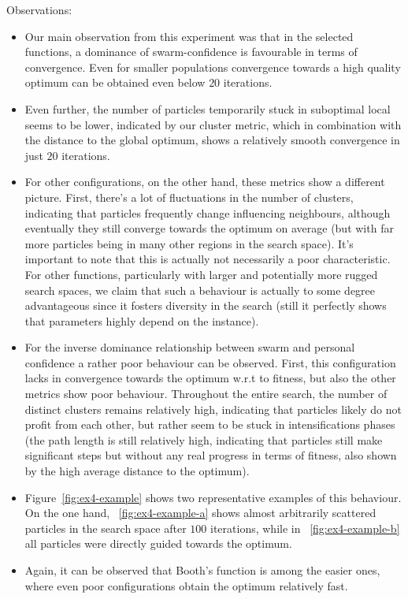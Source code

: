 \documentclass[12pt]{article}
\begin{document}
Observations:
\begin{itemize}
	\item Our main observation from this experiment was that in the selected functions, a dominance of swarm-confidence is favourable in terms of convergence. Even for smaller populations convergence towards a high quality optimum can be obtained even below $20$ iterations.
	\item Even further, the number of particles temporarily stuck in suboptimal local seems to be lower, indicated by our cluster metric, which in combination with the distance to the global optimum, shows a relatively smooth convergence in just $20$ iterations. 
	\item For other configurations, on the other hand, these metrics show a different picture. First, there's a lot of fluctuations in the number of clusters, indicating that particles frequently change influencing neighbours, although eventually they still converge towards the optimum on average (but with far more particles being in many other regions in the search space). It's important to note that this is actually not necessarily a poor characteristic. For other functions, particularly with larger and potentially more rugged search spaces, we claim that such a behaviour is actually to some degree advantageous since it fosters diversity in the search (still it perfectly shows that parameters highly depend on the instance).
	\item For the inverse dominance relationship between swarm and personal confidence a rather poor behaviour can be observed. First, this configuration lacks in convergence towards the optimum w.r.t to fitness, but also the other metrics show poor behaviour. Throughout the entire search, the number of distinct clusters remains relatively high, indicating that particles likely do not profit from each other, but rather seem to be stuck in intensifications phases (the path length is still relatively high, indicating that particles still make significant steps but without any real progress in terms of fitness, also shown by the high average distance to the optimum). 
	\item Figure~\ref{fig:ex4-example} shows two representative examples of this behaviour. On the one hand, ~\ref{fig:ex4-example-a} shows almost arbitrarily scattered particles in the search space after $100$ iterations, while in ~\ref{fig:ex4-example-b} all particles were directly guided towards the optimum. 
	\item Again, it can be observed that Booth's function is among the easier ones, where even poor configurations obtain the optimum relatively fast. 
\end{itemize}
\end{document}
